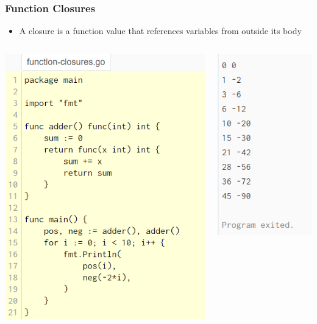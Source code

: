 \documentclass[14pt]{beamer}
\begin{document}
{
\begin{frame}
    \frametitle{Function Closures}
    \begin{itemize}
        \item A closure is a function value that references variables from outside its body
    \end{itemize}
    \begin{columns}
        \begin{column}{0.6\textwidth}
            \includegraphics[width=0.65\linewidth]{img/functionclosures.PNG}
        \end{column}
        \begin{column}{0.4\textwidth}
            \includegraphics[width=0.5\linewidth]{img/functionclosuresoutput.PNG}
        \end{column}
    \end{columns}
\end{frame}
}
\end{document}
